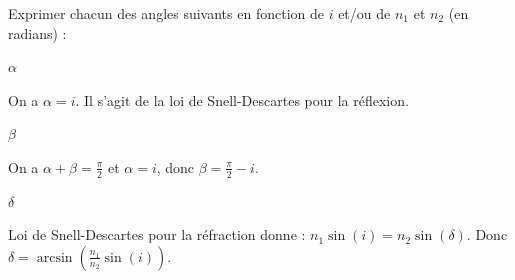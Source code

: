 	
	\smallskip
	
		Exprimer chacun des angles suivants en fonction de $i$ et/ou de $n_1$ et $n_2$ (en radians) :

	
	
	\debutEntrainement
	
	
	
	\begin{enonce}
		$\alpha$
	\end{enonce}
	
	
	\begin{corrige}
		On a $\alpha=i$. Il s'agit de la loi de Snell-Descartes pour la réflexion.
	\end{corrige}
	
	
	
	
	\begin{enonce}
		$\beta$
	\end{enonce}
	
	
	\begin{corrige}
		On a $\alpha+\beta=\frac{\pi}{2}$ et $\alpha=i$, donc $\beta=\frac{\pi}{2}-i$.
	\end{corrige}
	
	
	
	
	\begin{enonce}
		$\delta$
	\end{enonce}
	
	
	\begin{corrige}
		Loi de Snell-Descartes pour la réfraction donne : $n_1\sin(i)=n_2\sin(\delta)$. Donc $\delta=\arcsin\left(\frac{n_1}{n_2}\sin(i)\right)$.
	\end{corrige}
	
	
	
